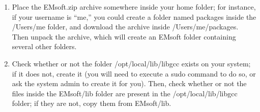 \documentclass[DIV=calc, paper=letter, fontsize=11pt]{scrartcl}	 %
\begin{document}
\begin{enumerate}
\item Place the \textsf{EMsoft.zip} archive somewhere inside your home folder; for instance, if your username is ``me,'' you could create 
a folder named \textsf{packages} inside the \textsf{/Users/me} folder, and download the archive inside \textsf{/Users/me/packages}.
Then unpack the archive, which will create an \textsf{EMsoft} folder containing several other folders.

\item Check whether or not the folder \textsf{/opt/local/lib/libgcc} exists on your system; if it does not,
create it (you will need to execute a \textsf{sudo} command to do so, or ask the system admin to 
create it for you).  Then, check whether or not the files inside the \textsf{EMsoft/lib} folder are present 
in the \textsf{/opt/local/lib/libgcc} folder; if they are not, copy them from \textsf{EMsoft/lib}.


\end{enumerate}
\end{document}
